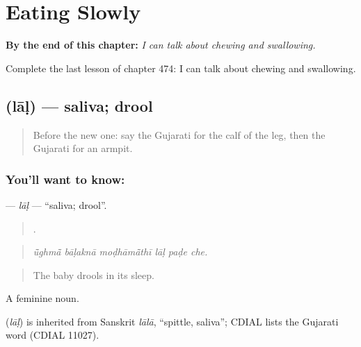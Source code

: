 
\chapter{Eating Slowly}
\label{ch:gu-eating-slowly}

\begin{chapteropening}
\textbf{By the end of this chapter:} \emph{I can talk about chewing and swallowing.}

Complete the last lesson of chapter 474: I can talk about chewing and swallowing.
\end{chapteropening}

\section[\texorpdfstring{\gu{લાળ} (lāḷ)}{લાળ (lāḷ)}]{ (lāḷ) — saliva; drool}

\label{lesson:GU-C474-lal}



\begin{quote}
Before the new one: say the Gujarati for the calf of the leg, then the Gujarati for an armpit.
\end{quote}

\subsection*{You'll want to know: }
\textbf{} — \emph{lāḷ} — \textquotedblleft{}saliva; drool\textquotedblright{}.

\begin{quote}
     .
\end{quote}

\begin{quote}
\emph{ū̃ghmā̃ bāḷaknā moḍhāmā̃thī lāḷ paḍe che.}
\end{quote}

\begin{quote}
The baby drools in its sleep.
\end{quote}

A feminine noun.

\begin{cousinweb}
\textbf{} (\emph{lāḷ}) is inherited from Sanskrit \emph{lālā}, \textquotedblleft{}spittle, saliva\textquotedblright{}; CDIAL lists the Gujarati word (CDIAL 11027).
\end{cousinweb}

